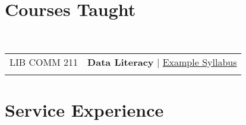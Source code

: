 \documentclass[a4paper,10pt]{article}
\begin{document}
\section{Courses Taught}\\
\begin{tabular}{r|p{11cm}}
\textsc{LIB COMM 211} & \textbf{Data Literacy} | \href{https://docs.google.com/document/d/1Vjjl1IeCBEt7Ul4IiHe3B3nfNKuz4sUREO8X8fZREfA/edit?usp=sharing}{Example Syllabus}
\\\multicolumn{2}{c}{} \\
\end{tabular}

\section{Service Experience}
\end{document}
